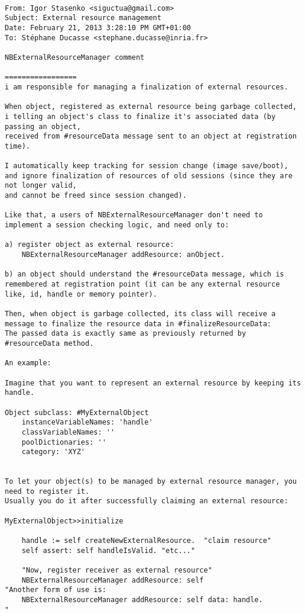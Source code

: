 \documentclass[a4paper,10pt,twoside]{book}
\begin{document}
\begin{verbatim}

From: Igor Stasenko <siguctua@gmail.com>
Subject: External resource management
Date: February 21, 2013 3:28:10 PM GMT+01:00
To: Stéphane Ducasse <stephane.ducasse@inria.fr>

NBExternalResourceManager comment

=================
i am responsible for managing a finalization of external resources.

When object, registered as external resource being garbage collected,
i telling an object's class to finalize it's associated data (by
passing an object,
received from #resourceData message sent to an object at registration time).

I automatically keep tracking for session change (image save/boot),
and ignore finalization of resources of old sessions (since they are
not longer valid,
and cannot be freed since session changed).

Like that, a users of NBExternalResourceManager don't need to
implement a session checking logic, and need only to:

a) register object as external resource:
    NBExternalResourceManager addResource: anObject.

b) an object should understand the #resourceData message, which is
remembered at registration point (it can be any external resource
like, id, handle or memory pointer).

Then, when object is garbage collected, its class will receive a
message to finalize the resource data in #finalizeResourceData:
The passed data is exactly same as previously returned by #resourceData method.

An example:

Imagine that you want to represent an external resource by keeping its handle.

Object subclass: #MyExternalObject
	instanceVariableNames: 'handle'
	classVariableNames: ''
	poolDictionaries: ''
	category: 'XYZ'
	

To let your object(s) to be managed by external resource manager, you
need to register it.
Usually you do it after successfully claiming an external resource:

MyExternalObject>>initialize

	handle := self createNewExternalResource.  "claim resource"
	self assert: self handleIsValid. "etc..."
	
	"Now, register receiver as external resource"
	NBExternalResourceManager addResource: self
"Another form of use is:
	NBExternalResourceManager addResource: self data: handle.
"


\end{verbatim}
\end{document}
